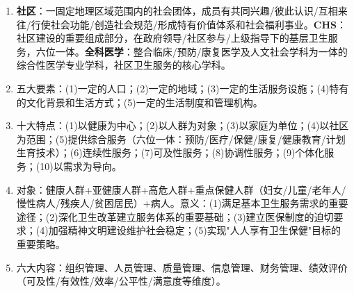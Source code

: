 \begin{enumerate}[leftmargin=*, itemsep=5pt]
    \item \textbf{社区}：一固定地理区域范围内的社会团体，成员有共同兴趣/彼此认识/互相来往/行使社会功能/创造社会规范/形成特有价值体系和社会福利事业。\textbf{CHS}：社区建设的重要组成部分，在政府领导/社区参与/上级指导下的基层卫生服务，六位一体。\textbf{全科医学}：整合临床/预防/康复医学及人文社会学科为一体的综合性医学专业学科，社区卫生服务的核心学科。
    \item 五大要素：(1)一定的人口；(2)一定的地域；(3)一定的生活服务设施；(4)特有的文化背景和生活方式；(5)一定的生活制度和管理机构。
    \item 十大特点：(1)以健康为中心；(2)以人群为对象；(3)以家庭为单位；(4)以社区为范围；(5)提供综合服务（六位一体：预防/医疗/保健/康复/健康教育/计划生育技术）；(6)连续性服务；(7)可及性服务；(8)协调性服务；(9)个体化服务；(10)以需求为导向。
    \item 对象：健康人群+亚健康人群+高危人群+重点保健人群（妇女/儿童/老年人/慢性病人/残疾人/贫困居民）+病人。意义：(1)满足基本卫生服务需求的重要途径；(2)深化卫生改革建立服务体系的重要基础；(3)建立医保制度的迫切要求；(4)加强精神文明建设维护社会稳定；(5)实现"人人享有卫生保健"目标的重要策略。
    \item 六大内容：组织管理、人员管理、质量管理、信息管理、财务管理、绩效评价（可及性/有效性/效率/公平性/满意度等维度）。
\end{enumerate}

\newpage
